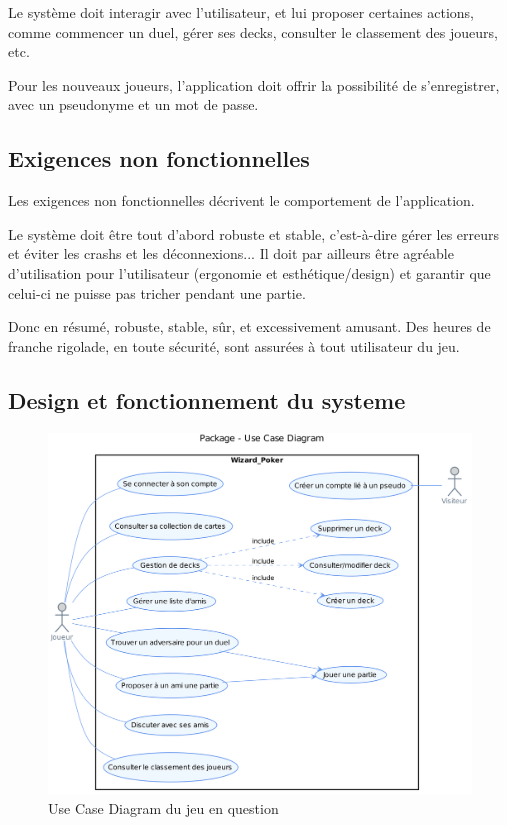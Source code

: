 \documentclass[11pt,a4paper]{article}
\begin{document}
Le système doit interagir avec l'utilisateur, et lui proposer
certaines actions, comme commencer un duel, gérer ses decks, consulter
le classement des joueurs, etc.

Pour les nouveaux joueurs, l'application doit offrir la possibilité de
s'enregistrer, avec un pseudonyme et un mot de passe.


\subsection{Exigences non fonctionnelles}
\label{sec:exi-nonfonc-sys}

Les exigences non fonctionnelles décrivent le comportement de
l'application.

Le système doit être tout d'abord robuste et stable, c'est-à-dire
gérer les erreurs et éviter les crashs et les déconnexions... Il doit
par ailleurs être agréable d'utilisation pour l'utilisateur (ergonomie
et esthétique/design) et garantir que celui-ci ne puisse pas tricher
pendant une partie.

Donc en résumé, robuste, stable, sûr, et excessivement amusant. Des
heures de franche rigolade, en toute sécurité, sont assurées à tout
utilisateur du jeu.

\subsection{Design et fonctionnement du systeme}
\label{sec:design}


\begin{figure}[ht]
  \centering
  \includegraphics[width=1\textwidth]{uml_files/UseCaseDiagram.png}
  \caption{\label{fig:usecase} Use Case Diagram du jeu en question}
\end{figure}
\end{document}
